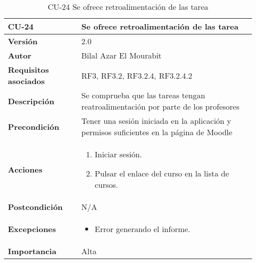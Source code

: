\begin{table}[H]
	\centering
	\begin{tabularx}{\linewidth}{ p{} p{} }
		\toprule
		\textbf{CU-24}    & \textbf{Se ofrece retroalimentación de las tarea}\\
		\toprule
		\textbf{Versión}              & 2.0   \\
		\textbf{Autor}                & Bilal Azar El Mourabit \\
		\textbf{Requisitos asociados} & RF3, RF3.2, RF3.2.4, RF3.2.4.2 \\
		\textbf{Descripción}          & Se comprueba que las tareas tengan reatroalimentación por parte de los profesores\\
    		\textbf{Precondición}         & Tener una sesión iniciada en la aplicación y permisos suficientes en la página de Moodle\\
		\textbf{Acciones}             & 
		\begin{enumerate}
			\def\labelenumi{\arabic{enumi}.}
			\tightlist
			\item Iniciar sesión.
            \item Pulsar el enlace del curso en la lista de cursos. 
		\end{enumerate}\\
		\textbf{Postcondición}        & N/A \\
		\textbf{Excepciones}          & \begin{itemize}
		    \item Error generando el informe.
		\end{itemize} \\
		\textbf{Importancia}          & Alta \\
		\bottomrule
	\end{tabularx}
	\caption{CU-24 Se ofrece retroalimentación de las tarea}
\end{table}

